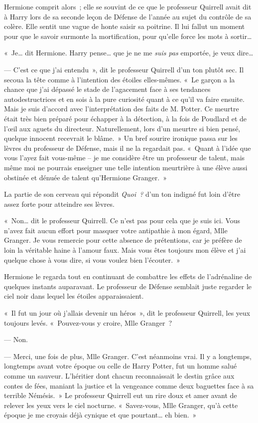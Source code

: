 Hermione comprit alors~; elle se souvint de ce que le professeur Quirrell avait dit à Harry lors de sa seconde leçon de Défense de l'année au sujet du contrôle de sa colère. Elle sentit une vague de honte saisir sa poitrine. Il lui fallut un moment pour que le savoir surmonte la mortification, pour qu'elle force les mots à sortir…

«~Je… dit Hermione. Harry pense… que je ne me \emph{suis pas} emportée, je veux dire…

--- C'est ce que j'ai entendu~», dit le professeur Quirrell d'un ton plutôt sec. Il secoua la tête comme à l'intention des étoiles elles-mêmes. «~Le garçon a la chance que j'ai dépassé le stade de l'agacement face à ses tendances autodestructrices et en sois à la pure curiosité quant à ce qu'il va faire ensuite. Mais je suis d'accord avec l'interprétation des faits de M. Potter. Ce meurtre était très bien préparé pour échapper à la détection, à la fois de Poudlard et de l'œil aux aguets du directeur. Naturellement, lors d'un meurtre si bien pensé, quelque innocent recevrait le blâme.~» Un bref sourire ironique passa sur les lèvres du professeur de Défense, mais il ne la regardait pas. «~Quant à l'idée que vous l'ayez fait vous-même -- je me considère être un professeur de talent, mais même moi ne pourrais enseigner une telle intention meurtrière à une élève aussi obstinée et dénuée de talent qu'Hermione Granger.~»

La partie de son cerveau qui répondit \emph{Quoi~?} d'un ton indigné fut loin d'être assez forte pour atteindre ses lèvres.

«~Non… dit le professeur Quirrell. Ce n'est pas pour cela que je suis ici. Vous n'avez fait aucun effort pour masquer votre antipathie à mon égard, Mlle Granger. Je vous remercie pour cette absence de prétentions, car je préfère de loin la véritable haine à l'amour faux. Mais vous êtes toujours mon élève et j'ai quelque chose à vous dire, si vous voulez bien l'écouter.~»

Hermione le regarda tout en continuant de combattre les effets de l'adrénaline de quelques instants auparavant. Le professeur de Défense semblait juste regarder le ciel noir dans lequel les étoiles apparaissaient.

«~Il fut un jour où j'allais devenir un héros~», dit le professeur Quirrell, les yeux toujours levés. «~Pouvez-vous y croire, Mlle Granger~?

--- Non.

--- Merci, une fois de plus, Mlle Granger. C'est néanmoins vrai. Il y a longtemps, longtemps avant votre époque ou celle de Harry Potter, fut un homme salué comme un sauveur. L'héritier dont chacun reconnaissait le destin grâce aux contes de fées, maniant la justice et la vengeance comme deux baguettes face à sa terrible Némésis.~» Le professeur Quirrell eut un rire doux et amer avant de relever les yeux vers le ciel nocturne. «~Savez-vous, Mlle Granger, qu'à cette époque je me croyais déjà cynique et que pourtant… eh bien.~»

